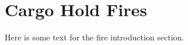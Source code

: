 \section{Cargo Hold Fires}
\label{sec:introduction:fire}

Here is some text for the fire introduction section.
